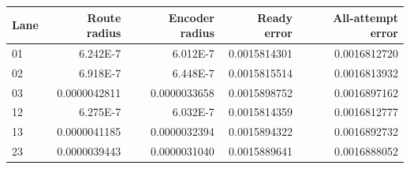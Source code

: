 \begin{tabular}{lrrrr}\toprule
Lane & Route radius & Encoder radius & Ready error & All-attempt error\\\midrule
01 & 6.242E-7 & 6.012E-7 & 0.0015814301 & 0.0016812720\\
02 & 6.918E-7 & 6.448E-7 & 0.0015815514 & 0.0016813932\\
03 & 0.0000042811 & 0.0000033658 & 0.0015898752 & 0.0016897162\\
12 & 6.275E-7 & 6.032E-7 & 0.0015814359 & 0.0016812777\\
13 & 0.0000041185 & 0.0000032394 & 0.0015894322 & 0.0016892732\\
23 & 0.0000039443 & 0.0000031040 & 0.0015889641 & 0.0016888052\\
\bottomrule\end{tabular}

